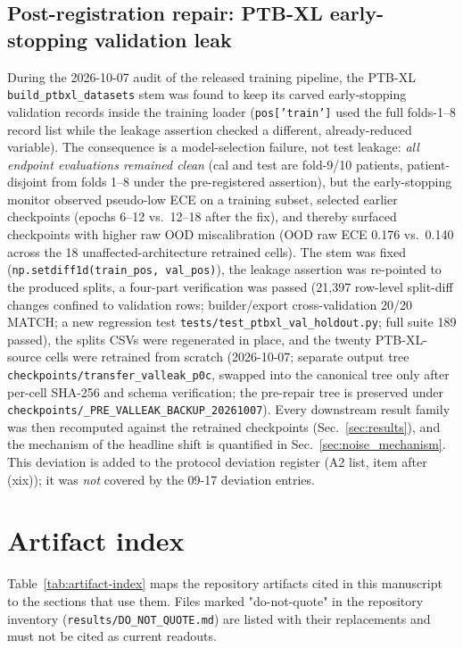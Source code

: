 \documentclass[review,12pt,nonatbib]{elsarticle}
\begin{document}
\subsection{Post-registration repair: PTB-XL early-stopping validation leak}
\label{sec:repair}
During the 2026-10-07 audit of the released training pipeline, the PTB-XL
\texttt{build\_ptbxl\_datasets} stem was found to keep its carved
early-stopping validation records inside the training loader
(\texttt{pos['train']} used the full folds-1--8 record list while the
leakage assertion checked a different, already-reduced variable). The
consequence is a model-selection failure, not test leakage: \emph{all
endpoint evaluations remained clean} (cal and test are fold-9/10 patients,
patient-disjoint from folds 1--8 under the pre-registered assertion), but
the early-stopping monitor observed pseudo-low ECE on a training subset,
selected earlier checkpoints (epochs 6--12 vs.\ 12--18 after the fix),
and thereby surfaced checkpoints with higher raw OOD miscalibration
(OOD raw ECE 0.176 vs.\ 0.140 across the 18 unaffected-architecture
retrained cells). The stem was fixed
(\texttt{np.setdiff1d(train\_pos, val\_pos)}), the leakage assertion was
re-pointed to the produced splits, a four-part verification was passed
(21{,}397 row-level split-diff changes confined to validation rows;
builder/export cross-validation 20/20 MATCH; a new regression test
\texttt{tests/test\_ptbxl\_val\_holdout.py}; full suite 189 passed), the
splits CSVs were regenerated in place, and the twenty PTB-XL-source cells
were retrained from scratch (2026-10-07; separate output tree
\texttt{checkpoints/transfer\_valleak\_p0c}, swapped into the canonical
tree only after per-cell SHA-256 and schema verification; the pre-repair
tree is preserved under
\texttt{checkpoints/\_PRE\_VALLEAK\_BACKUP\_20261007}). Every downstream
result family was then recomputed against the retrained checkpoints
(Sec.~\ref{sec:results}), and the mechanism of the headline shift is
quantified in Sec.~\ref{sec:noise_mechanism}. This
deviation is added to the protocol deviation register (A2 list, item
after (xix)); it was \emph{not} covered by the 09-17 deviation entries.


\section{Artifact index}
\label{app:artifact-index}
\setcounter{table}{0}

Table~\ref{tab:artifact-index} maps the repository artifacts cited
in this manuscript to the sections that use them. Files marked
"do-not-quote" in the repository inventory
(\texttt{results/DO\_NOT\_QUOTE.md}) are listed with their
replacements and must not be cited as current readouts.
\end{document}
